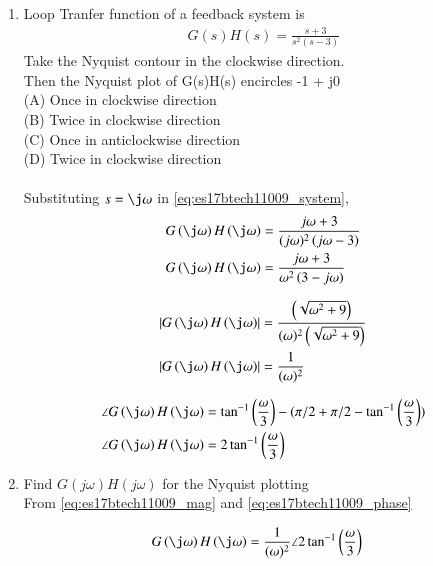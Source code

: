 \begin{enumerate}[label=\thesection.\arabic*.,ref=\thesection.\theenumi]

\item Loop Tranfer function of a feedback system is 
\begin{align}
G(s)H(s) = \frac{s+3}{s^2(s-3)}
\label{eq:es17btech11009_system}
\end{align}
Take the Nyquist contour in the clockwise direction.
\\
Then the Nyquist plot of G(s)H(s) encircles -1 + j0
\\
(A) Once in clockwise direction
\\
(B) Twice in clockwise direction
\\
(C) Once in anticlockwise direction
\\
(D) Twice in clockwise direction
\\
\\
\solution Substituting $s = \j\omega$ in \eqref{eq:es17btech11009_system},
\begin{align}
G\brak{\j\omega}H\brak{\j\omega}&=\frac{j\omega+3}{(j\omega)^2\brak{j\omega- 3}}
\\
G\brak{\j\omega}H\brak{\j\omega}&=\frac{j\omega+3}{\omega^2\brak{3 - j\omega}}
\end{align}

\begin{align}
\abs{G\brak{\j\omega}H\brak{\j\omega}}&=\frac{\brak{\sqrt{\omega^2+9}}}{(\omega)^2\brak{\sqrt{\omega^2+9}}}
\\
\abs{G\brak{\j\omega}H\brak{\j\omega}}&=\dfrac{1}{(\omega)^2}
\label{eq:es17btech11009_mag}
\end{align}

\begin{align}
\angle{G\brak{\j\omega}H\brak{\j\omega}}&=\tan^{-1}\brak{\frac{\omega}{3}} - (\pi/2 + \pi/2 -  \tan^{-1}\brak{\frac{\omega}{3}} )
\\
\angle{G\brak{\j\omega}H\brak{\j\omega}}&= 2\tan^{-1}\brak{\frac{\omega}{3}}
\label{eq:es17btech11009_phase}
\end{align}

\item Find $G(j\omega)H(j\omega)$ for the Nyquist plotting
\\
\solution From \eqref{eq:es17btech11009_mag} and \eqref{eq:es17btech11009_phase} 

\begin{align}
G\brak{\j\omega}H\brak{\j\omega}&= \dfrac{1}{(\omega)^2}\angle2\tan^{-1}\brak{\frac{\omega}{3}}
\end{align}


\end{enumerate}
